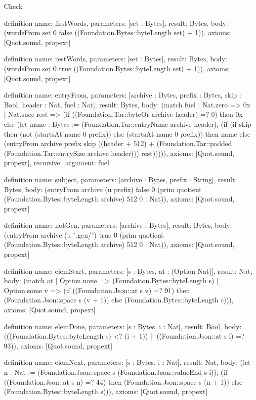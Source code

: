 \begin{lexlean}{Check}
\begin{semanticmodule}
definition{
  name: firstWords,
  parameters: [set : Bytes],
  result: Bytes,
  body: (wordsFrom set 0 false ((Foundation.Bytes::byteLength set) + 1)),
  axioms: [Quot.sound, propext]
}

definition{
  name: restWords,
  parameters: [set : Bytes],
  result: Bytes,
  body: (wordsFrom set 0 true ((Foundation.Bytes::byteLength set) + 1)),
  axioms: [Quot.sound, propext]
}

definition{
  name: entryFrom,
  parameters: [archive : Bytes, prefix : Bytes, skip : Bool, header : Nat, fuel : Nat],
  result: Bytes,
  body: (match fuel
    | Nat.zero => 0x
    | Nat.succ rest => (if ((Foundation.Tar::byteOr archive header) =? 0) then 0x else (let name : Bytes := (Foundation.Tar::entryName archive header); (if (if skip then (not (startsAt name 0 prefix)) else (startsAt name 0 prefix)) then name else (entryFrom archive prefix skip ((header + 512) + (Foundation.Tar::padded (Foundation.Tar::entrySize archive header))) rest))))),
  axioms: [Quot.sound, propext],
  recursive_argument: fuel
}

definition{
  name: subject,
  parameters: [archive : Bytes, prefix : String],
  result: Bytes,
  body: (entryFrom archive (u prefix) false 0 (prim quotient (Foundation.Bytes::byteLength archive) 512 0 : Nat)),
  axioms: [Quot.sound, propext]
}

definition{
  name: notGen,
  parameters: [archive : Bytes],
  result: Bytes,
  body: (entryFrom archive (u ".gen/") true 0 (prim quotient (Foundation.Bytes::byteLength archive) 512 0 : Nat)),
  axioms: [Quot.sound, propext]
}

definition{
  name: elemStart,
  parameters: [s : Bytes, at : (Option Nat)],
  result: Nat,
  body: (match at
    | Option.none => (Foundation.Bytes::byteLength s)
    | Option.some v => (if ((Foundation.Json::at s v) =? 91) then (Foundation.Json::space s (v + 1)) else (Foundation.Bytes::byteLength s))),
  axioms: [Quot.sound, propext]
}

definition{
  name: elemDone,
  parameters: [s : Bytes, i : Nat],
  result: Bool,
  body: (((Foundation.Bytes::byteLength s) <? (i + 1)) || ((Foundation.Json::at s i) =? 93)),
  axioms: [Quot.sound, propext]
}

definition{
  name: elemNext,
  parameters: [s : Bytes, i : Nat],
  result: Nat,
  body: (let n : Nat := (Foundation.Json::space s (Foundation.Json::valueEnd s i)); (if ((Foundation.Json::at s n) =? 44) then (Foundation.Json::space s (n + 1)) else (Foundation.Bytes::byteLength s))),
  axioms: [Quot.sound, propext]
}


\end{semanticmodule}
\end{lexlean}
